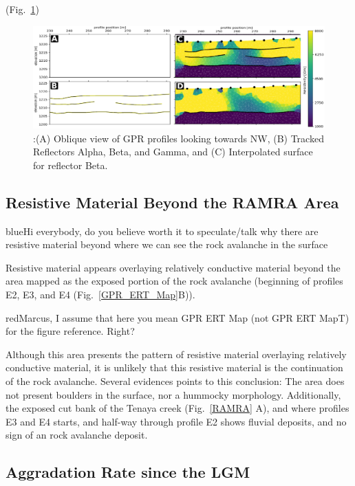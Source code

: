 \documentclass[utf8]{frontiersSCNS}
\newcommand{\COMON}{\begin{color}{blue}}
\newcommand{\COMOFF}{\end{color}}
\newcommand{\alon}{\begin{color}{red}}
\newcommand{\aloff}{\end{color}}
\begin{document}
				(Fig.~\ref{Combined_ABCD})			

                                \begin{figure}[h]

	\includegraphics[width=\textwidth]{Figures/Combined_ABCD.pdf}
		\caption{:(A) Oblique view of GPR profiles looking towards NW, (B) Tracked Reflectors Alpha, Beta, and Gamma, and (C) Interpolated surface for reflector Beta. \label{Combined_ABCD}}

								   \end{figure}



\subsection{Resistive Material Beyond the RAMRA Area}

\COMON Hi everybody, do you believe worth it to speculate/talk why there are resistive material beyond where we can see the rock avalanche in the surface \COMOFF

Resistive material appears overlaying relatively conductive material
beyond the area mapped as the exposed portion of the rock avalanche
(beginning of profiles E2, E3, and E4
(Fig.~\ref{GPR_ERT_Map}B)). \alon Marcus, I assume that here you mean
GPR ERT Map (not GPR ERT MapT) for the figure reference. Right? \aloff 

Although this area presents the pattern of resistive material overlaying relatively conductive material, it is unlikely that this resistive material is the continuation of the rock avalanche. Several evidences points to this conclusion: The area does not present boulders in the surface, nor a hummocky morphology. Additionally, the exposed cut bank of the Tenaya creek (Fig.~\ref{RAMRA} A), and where profiles E3 and E4 starts, and half-way through profile E2 shows fluvial deposits, and no sign of an rock avalanche deposit.  


\subsection{Aggradation Rate since the LGM}
\end{document}
